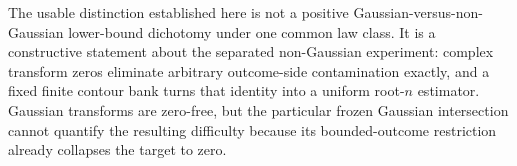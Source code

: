 The usable distinction established here is not a positive Gaussian-versus-non-Gaussian lower-bound dichotomy under one common law class.  It is a constructive statement about the separated non-Gaussian experiment: complex transform zeros eliminate arbitrary outcome-side contamination exactly, and a fixed finite contour bank turns that identity into a uniform root-\(n\) estimator.  Gaussian transforms are zero-free, but the particular frozen Gaussian intersection cannot quantify the resulting difficulty because its bounded-outcome restriction already collapses the target to zero.
